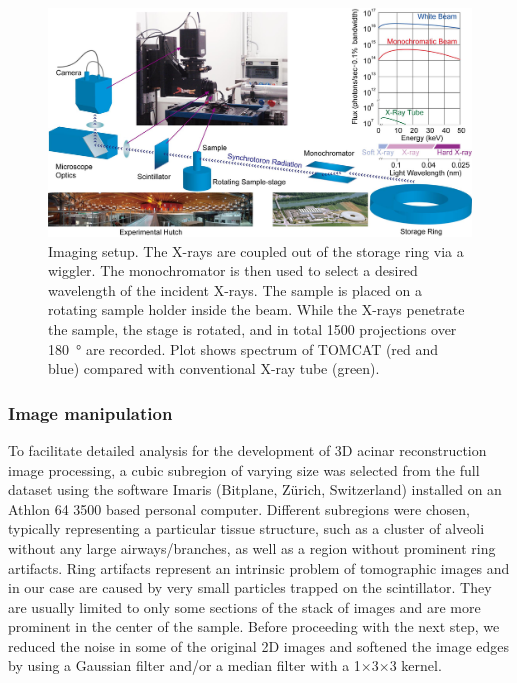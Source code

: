 \begin{figure}[htb]
	\centering
	\includegraphics[width=\imsize]{img/Tsuda2008/Tsuda-02}
	\caption[SRXTM imaging setup]{Imaging setup. The X-rays are coupled out of the storage ring via a wiggler. The monochromator is then used to select a desired wavelength of the incident
X-rays. The sample is placed on a rotating sample holder inside the beam. While the X-rays penetrate the sample, the stage is rotated, and in total 1500 projections over \SI{180}{\degree} are recorded. Plot shows spectrum of TOMCAT (red and blue) compared with conventional X-ray tube (green).}
	\label{fig:imaging setup}
\end{figure}

\subsubsection{Image manipulation}
To facilitate detailed analysis for the development of 3D acinar reconstruction image processing, a cubic subregion of varying size was selected from the full dataset using the software Imaris (Bitplane, Zürich, Switzerland) installed on an Athlon 64 3500 based personal computer. Different subregions were chosen, typically representing a particular tissue structure, such as a cluster of alveoli without any large airways/branches, as well as a region without prominent ring artifacts. Ring artifacts represent an intrinsic problem of tomographic images and in our case are caused by very small particles trapped on the scintillator. They are usually limited to only some sections of the stack of images and are more prominent in the center of the sample. Before proceeding with the next step, we reduced the noise in some of the original 2D images and softened the image edges by using a Gaussian filter and/or a median filter with a 1$\times$3$\times$3 kernel.

